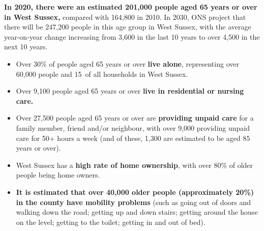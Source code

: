 \begin{tcolorbox}[title={Population aged 65 years or over}, colback={boxcolour}]
    {\bfseries In 2020, there were an estimated 201,000 people aged 65 years or over in West Sussex,} compared with 164,800 in 2010. In 2030, ONS project that there will be 247,200 people in this age group in West Sussex, with the average year-on-year change increasing from 3,600 in the last 10 years to over 4,500 in the next 10 years.
    
    \begin{itemize}[noitemsep]
        \item Over 30\% of people aged 65 years or over {\bfseries live alone}, representing over 60,000 people and 15\ of all households in West Sussex.
        \item Over 9,100 people aged 65 years or over {\bfseries live in residential or nursing care.}
        \item Over 27,500 people aged 65 years or over are {\bfseries providing unpaid care} for a family member, friend and/or neighbour, with over 9,000 providing unpaid care for 50+ hours a week (and of these, 1,300 are estimated to be aged 85 years or over).%
        \item West Sussex has a {\bfseries high rate of home ownership}, with over 80\% of older people being home owners.
        \item {\bfseries It is estimated that over 40,000 older people (approximately 20\%) in the county have mobility problems} (such as going out of doors and walking down the road; getting up and down stairs; getting around the house on the level; getting to the toilet; getting in and out of bed).
    \end{itemize}
\end{tcolorbox}

